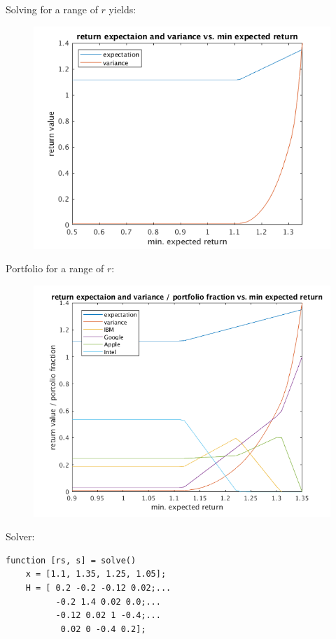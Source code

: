\documentclass[12pt,letter]{article}
\begin{document}
\begin{enumerate}
  Solving for a range of $r$ yields:
  \begin{figure}[H]
    \centering
    \includegraphics[width=13cm]{q8/q8_part_a.png}
  \end{figure}
  
  \pagebreak
  Portfolio for a range of $r$:
  \begin{figure}[H]
    \centering
    \includegraphics[width=14cm]{q8/q8_part_b.png}
  \end{figure}  
  Solver:
\begin{verbatim}
function [rs, s] = solve()
    x = [1.1, 1.35, 1.25, 1.05];
    H = [ 0.2 -0.2 -0.12 0.02;...
          -0.2 1.4 0.02 0.0;...
          -0.12 0.02 1 -0.4;...
           0.02 0 -0.4 0.2];


\end{verbatim}
\end{enumerate}
\end{document}
